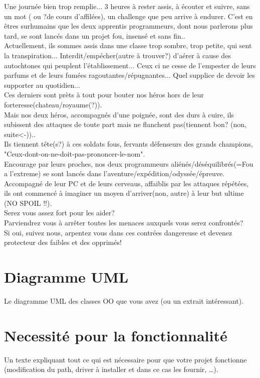 \documentclass[a4paper,titlepage]{article}
\begin{document}
	Une journée bien trop remplie... 3 heures à rester assis, à écouter et suivre, sans un mot ( ou ?de cours d'affilées), un challenge que peu arrive à endurer. C'est en êtres surhumains que les deux apprentis programmeurs, dont nous parlerons plus tard, se sont lancés dans un projet fou, insensé et sans fin..\\
	
	Actuellement, ils sommes assis dans une classe trop sombre, trop petite, qui sent la transpiration... Interdit/empécher(autre à trouver?) d'aérer à cause des autochtones qui peuplent l'établissement... Ceux ci ne cesse de l'empester de leurs parfums et de leurs fumées ragoutantes/répugnantes... Quel supplice de devoir les supporter au quotidien...\\
	Ces derniers sont prèts à tout pour bouter nos héros hors de leur forteresse(chateau/royaume(?)).\\
	
	Mais nos deux héros, accompagnés d'une poignée, sont des durs à cuire, ils subissent des attaques de toute part mais ne flanchent pas(tiennent bon? (non, suite<-))..\\ 
	Ils tiennent tête(s?) à ces soldats fous, fervants défenseurs des grands champions, "Ceux-dont-on-ne-doit-pas-prononcer-le-nom".\\
	
	Encourage par leurs proches, nos deux programmeurs aliénés/déséquilibrés(=Fou a l'extreme) se sont lancés dans l'aventure/expédition/odyssée/épreuve.\\
	Accompagné de leur PC et de leurs cerveaus, affaiblis par les attaques répétées, ils ont commencé à imaginer un moyen d'arriver(non, autre) à leur but ultime (NO SPOIL !!).\\
	
	Serez vous assez fort pour les aider?\\
	Parviendrez vous à arrêter toutes les menaces auxquels vous serez confrontés?\\
	Si oui, suivez nous, arpentez vous dans ces contrées dangereuse et devenez protecteur des faibles et des opprimés!
	
	\clearpage
	\section{Diagramme UML}
	Le diagramme UML des classes OO que vous avez (ou un extrait intéressant).\\
	\clearpage
	
	\section{Necessité pour la fonctionnalité}
	Un texte expliquant tout ce qui est nécessaire pour que votre projet fonctionne (modification du path, driver à installer et dans ce cas les fournir, …).
	\clearpage
	
\end{document}
